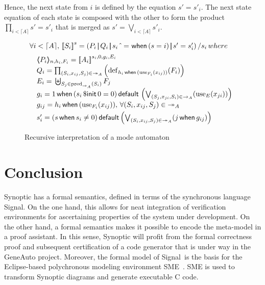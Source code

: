 \documentclass[copyright,creativecommons]{eptcs}
\newcommand{\signal}{{\sc Signal}}
\newcommand{\op}[1]{{\sf #1}}
\newcommand{\true}{1}
\newcommand{\kw}[1]{{{\,\op{#1}\,}}}
\newcommand{\Pre}{\kw{\$ init}}
\newcommand{\Sync}{\kw{\mbox{$\hat{~}$}=}}
\newcommand{\Default}{\kw{default}}
\newcommand{\When}{\kw{when}}
\newcommand{\Pred}{{\rm{pred}}}
\newcommand{\Par}{{\,|\!\!|\,}}
\newcommand{\Def}{{\rm{def}}}
\newcommand{\Use}{{\rm{use}}}
\newcommand{\ra}{\rightarrow}
\newcommand{\Sq}[1]{{[\![{#1}]\!]}}
\renewcommand{\:}{{:}}
\newcommand{\sq}[1]{\langle\!\!\langle{#1}\rangle\!\!\rangle}
\newcommand{\idx}[1]{\lceil{#1}\rceil}
\newcommand{\st}{{s.t.}}
\newcommand{\rra}{\twoheadrightarrow}
\newcommand{\dt}[1]{{\rra_{#1}}}
\renewcommand{\st}[1]{{\ra_{#1}}}
\begin{document}
Hence, the next state from $i$ is defined by the equation $s'=s'_i$. The next state equation of each state is composed with the other to form the product $\prod_{i< \idx{A}}s'=s'_i$ that is merged as $s'=\bigvee_{i< \idx{A}}s'_i$.


\begin{figure}[h!]
\hrulefill
\[
\begin{array}[t]{@{}@{}l}
\forall i< \idx{A},\,\Sq{S_i}^{s}=
\left(P_i\Par Q_i\Par s_i\Sync\When (s=i)\Par s'=s'_i\right)/s_i\,where\\[+\medskipamount]
\quad \sq{P_i}_{n,h_i,F_i}=\Sq{A_i}^{s_i,0,g_i,E_i}\\
\quad Q_i=\prod_{(S_i,x_{ij},S_j)\in\dt A}\left(\Def_{h_i\,\op{when}\,(\Use_{F_i}(x_{ij}))}(F_i)\right)\\[+\smallskipamount]
\quad E_i=\,\biguplus_{S_j\in\Pred_{\st A}(S_i)} F_j\\[+\smallskipamount]
\quad g_i=\true\When(s_i\Pre 0=0)\Default\left(\bigvee_{(S_j,x_{ji},S_i)\in\st A}(\Use_E(x_{ji}))\right)\\[+\smallskipamount]
\quad g_{ij}=h_i\When(\Use_{F_i}(x_{ij})),\,\forall (S_i,x_{ij},S_j)\in\dt A\\[+\smallskipamount]
\quad s'_i=(s\When s_i\neq 0)\Default\!\left(\bigvee_{(S_i,x_{ij},S_j)\in\dt A}(j\When g_{ij})\right)
\end{array}
\]
\hrulefill
\caption{Recursive interpretation of a mode automaton}\label{fig6}
\end{figure}








\section{Conclusion}
\label{Conclusion}

Synoptic has a formal semantics, defined in terms of the synchronous language \signal. On the one hand, this allows for neat integration of verification environments for ascertaining properties of the system under development. On the other hand, a formal semantics makes it possible to encode the meta-model in a proof assistant. In this sense, Synoptic will profit from the formal correctness proof and subsequent certification of a code generator that is  under way in the GeneAuto project.
Moreover, the formal model of \signal\ is the basis for the Eclipse-based polychronous modeling environment SME~\cite{Polychrony,SME}. SME is used to transform Synoptic diagrams and generate executable C code.
\end{document}
